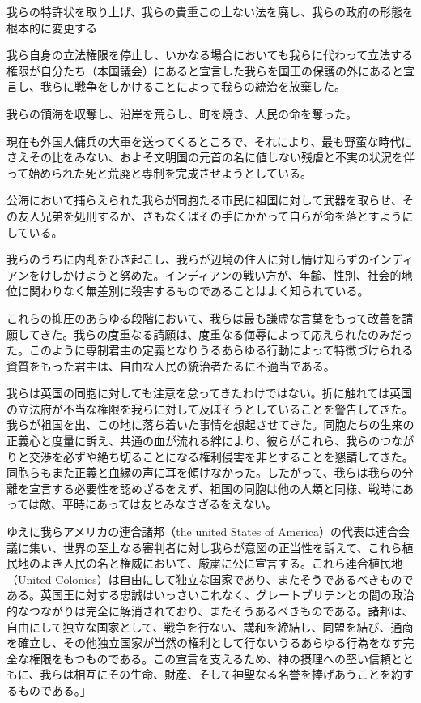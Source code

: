   我らの特許状を取り上げ、我らの貴重この上ない法を廃し、我らの政府の形態を根本的に変更する

  我ら自身の立法権限を停止し、いかなる場合においても我らに代わって立法する権限が自分たち（本国議会）にあると宣言した我らを国王の保護の外にあると宣言し、我らに戦争をしかけることによって我らの統治を放棄した。

  我らの領海を収奪し、沿岸を荒らし、町を焼き、人民の命を奪った。

  現在も外国人傭兵の大軍を送ってくるところで、それにより、最も野蛮な時代にさえその比をみない、およそ文明国の元首の名に値しない残虐と不実の状況を伴って始められた死と荒廃と専制を完成させようとしている。


公海において捕らえられた我らが同胞たる市民に祖国に対して武器を取らせ、その友人兄弟を処刑するか、さもなくばその手にかかって自らが命を落とすようにしている。

我らのうちに内乱をひき起こし、我らが辺境の住人に対し情け知らずのインディアンをけしかけようと努めた。インディアンの戦い方が、年齢、性別、社会的地位に関わりなく無差別に殺害するものであることはよく知られている。

これらの抑圧のあらゆる段階において、我らは最も謙虚な言葉をもって改善を請願してきた。我らの度重なる請願は、度重なる侮辱によって応えられたのみだった。このように専制君主の定義となりうるあらゆる行動によって特徴づけられる資質をもった君主は、自由な人民の統治者たるに不適当である。

我らは英国の同胞に対しても注意を怠ってきたわけではない。折に触れては英国の立法府が不当な権限を我らに対して及ぼそうとしていることを警告してきた。我らが祖国を出、この地に落ち着いた事情を想起させてきた。同胞たちの生来の正義心と度量に訴え、共通の血が流れる絆により、彼らがこれら、我らのつながりと交渉を必ずや絶ち切ることになる権利侵害を非とすることを懇請してきた。同胞らもまた正義と血縁の声に耳を傾けなかった。したがって、我らは我らの分離を宣言する必要性を認めざるをえず、祖国の同胞は他の人類と同様、戦時にあっては敵、平時にあっては友とみなさざるをえない。

ゆえに我らアメリカの連合諸邦（the united States of America）の代表は連合会議に集い、世界の至上なる審判者に対し我らが意図の正当性を訴えて、これら植民地のよき人民の名と権威において、厳粛に公に宣言する。これら連合植民地（United Colonies）は自由にして独立な国家であり、またそうであるべきものである。英国王に対する忠誠はいっさいこれなく、グレートブリテンとの間の政治的なつながりは完全に解消されており、またそうあるべきものである。諸邦は、自由にして独立な国家として、戦争を行ない、講和を締結し、同盟を結び、通商を確立し、その他独立国家が当然の権利として行ないうるあらゆる行為をなす完全な権限をもつものである。この宣言を支えるため、神の摂理への堅い信頼とともに、我らは相互にその生命、財産、そして神聖なる名誉を捧げあうことを約するものである。」



